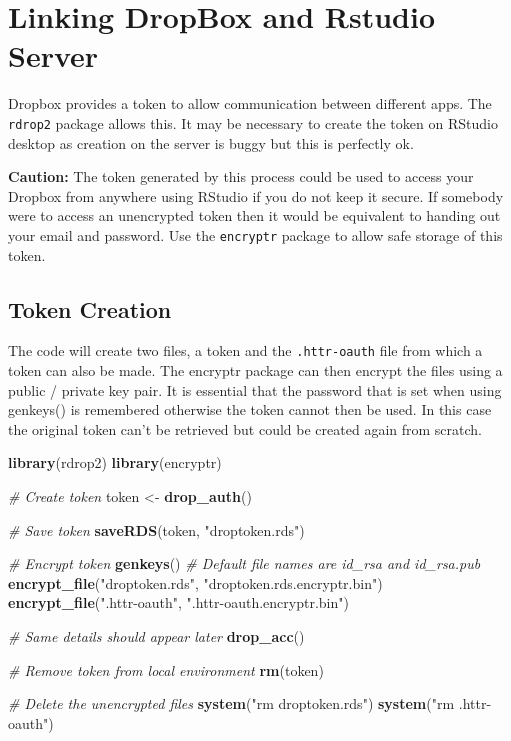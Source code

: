 \documentclass[
]{book}
\newenvironment{Shaded}{\begin{snugshade}}{\end{snugshade}}
\newcommand{\CommentTok}[1]{\textcolor[rgb]{0.56,0.35,0.01}{\textit{#1}}}
\newcommand{\KeywordTok}[1]{\textcolor[rgb]{0.13,0.29,0.53}{\textbf{#1}}}
\newcommand{\NormalTok}[1]{#1}
\newcommand{\StringTok}[1]{\textcolor[rgb]{0.31,0.60,0.02}{#1}}
\begin{document}
\hypertarget{linking-dropbox-and-rstudio-server}{%
\section{Linking DropBox and Rstudio Server}\label{linking-dropbox-and-rstudio-server}}

Dropbox provides a token to allow communication between different apps. The \texttt{rdrop2} package allows this. It may be necessary to create the token on RStudio desktop as creation on the server is buggy but this is perfectly ok.

\textbf{Caution:} The token generated by this process could be used to access your Dropbox from anywhere using RStudio if you do not keep it secure. If somebody were to access an unencrypted token then it would be equivalent to handing out your email and password. Use the \texttt{encryptr} package to allow safe storage of this token.

\hypertarget{token-creation}{%
\subsection{Token Creation}\label{token-creation}}

The code will create two files, a token and the \texttt{.httr-oauth} file from which a token can also be made. The encryptr package can then encrypt the files using a public / private key pair. It is essential that the password that is set when using genkeys() is remembered otherwise the token cannot then be used. In this case the original token can't be retrieved but could be created again from scratch.

\begin{Shaded}
\begin{Highlighting}[]
\KeywordTok{library}\NormalTok{(rdrop2)}
\KeywordTok{library}\NormalTok{(encryptr)}
 
\CommentTok{# Create token}
\NormalTok{token <-}\StringTok{ }\KeywordTok{drop_auth}\NormalTok{()}
 
\CommentTok{# Save token}
\KeywordTok{saveRDS}\NormalTok{(token, }\StringTok{"droptoken.rds"}\NormalTok{)}
 
\CommentTok{# Encrypt token}
\KeywordTok{genkeys}\NormalTok{()               }\CommentTok{# Default file names are id_rsa and id_rsa.pub}
\KeywordTok{encrypt_file}\NormalTok{(}\StringTok{"droptoken.rds"}\NormalTok{, }\StringTok{"droptoken.rds.encryptr.bin"}\NormalTok{)}
\KeywordTok{encrypt_file}\NormalTok{(}\StringTok{".httr-oauth"}\NormalTok{, }\StringTok{".httr-oauth.encryptr.bin"}\NormalTok{)}
 
\CommentTok{# Same details should appear later}
\KeywordTok{drop_acc}\NormalTok{()}
 
\CommentTok{# Remove token from local environment}
\KeywordTok{rm}\NormalTok{(token)}
 
 
\CommentTok{# Delete the unencrypted files}
\KeywordTok{system}\NormalTok{(}\StringTok{"rm droptoken.rds"}\NormalTok{)}
\KeywordTok{system}\NormalTok{(}\StringTok{"rm .httr-oauth"}\NormalTok{)}
\end{Highlighting}
\end{Shaded}
\end{document}
